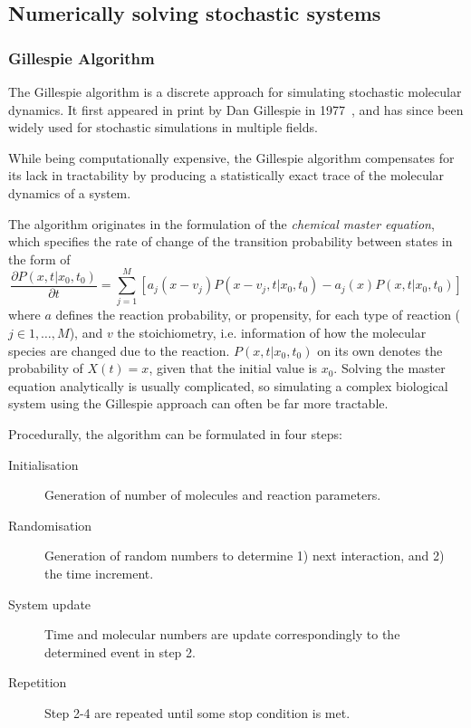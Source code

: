 \subsection[Stochastic Simulations]{Numerically solving stochastic systems}
\label{sec:stoch_sim}
\subsubsection{Gillespie Algorithm}
\label{sec:gillespie}
The Gillespie algorithm is a discrete approach for simulating stochastic
molecular dynamics. It first appeared in print by Dan Gillespie in
1977~\cite{gillespie1977exact}, and has
since been widely used for stochastic simulations in multiple fields.

While being computationally expensive, the Gillespie algorithm compensates for
its lack in tractability by producing a statistically exact trace of the
molecular dynamics of a system. 

The algorithm originates in the formulation of the \textit{chemical master equation},
which specifies the rate of change of the transition probability between states
in the form of 
\begin{equation}
  \dfrac{\partial P\left( x,t | x_0, t_0 \right)}{\partial t} = 
  \sum_{j =
    1}^{M} \left[ a_j\left( x-v_j \right)P\left( x-v_j, t|x_0,t_0 \right) -
    a_j(x)P\left( x,t|x_0,t_0 \right) \right]
\end{equation}
where $a$ defines the reaction probability, or propensity, for each type of
reaction ($j \in {1, \ldots, M}$), and
$v$ the stoichiometry, i.e. information of how the molecular species are changed
due to the reaction. $P(x,t | x_0, t_0)$ on its own denotes the probability of
$X(t) = x$, given that the initial value is $x_0$. Solving the master equation
analytically is usually complicated, so  
simulating a complex biological system using the Gillespie approach can often be
far more tractable.

Procedurally, the algorithm can be formulated in four steps: 
\begin{description}
  \item[Initialisation] Generation of number of molecules and reaction
    parameters. 
  \item[Randomisation] Generation of random numbers to determine 1) next
    interaction, and 2) the time increment.
  \item[System update] Time and molecular numbers are update correspondingly
    to the determined event in step 2.
  \item[Repetition] Step 2-4 are repeated until some stop condition is met.
\end{description}

